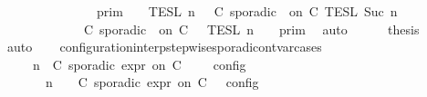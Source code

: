 \begin{isabellebody}
\ \ \ \ \ \ \ \ \ \ \ \ {\isasymunion}\ {\isasymlbrakk}{\isasymlbrakk}\ {\isasymGamma}\ {\isasymrbrakk}{\isasymrbrakk}\isactrlsub p\isactrlsub r\isactrlsub i\isactrlsub m\ {\isasyminter}\ {\isasymlbrakk}{\isasymlbrakk}\ {\isasymPsi}\ {\isasymrbrakk}{\isasymrbrakk}\isactrlsub T\isactrlsub E\isactrlsub S\isactrlsub L\isactrlbsup {\isasymge}\ n\isactrlesup \ {\isasyminter}\ {\isasymlbrakk}\ C\ sporadic\ {\isasymtau}\ on\ C\ {\isasymrbrakk}\isactrlsub T\isactrlsub E\isactrlsub S\isactrlsub L\isactrlbsup {\isasymge}\ Suc\ n\isactrlesup \isanewline
\ \ \ \ \ \ \ \ \ \ \ {\isacharequal}\ {\isasymlbrakk}{\isasymlbrakk}\ {\isacharparenleft}C\ sporadic\ {\isasymtau}\ on\ C\ {\isacharhash}\ {\isasymPsi}\ {\isasymrbrakk}{\isasymrbrakk}\isactrlsub T\isactrlsub E\isactrlsub S\isactrlsub L\isactrlbsup {\isasymge}\ n\isactrlesup \ {\isasyminter}\ {\isasymlbrakk}{\isasymlbrakk}\ {\isasymGamma}\ {\isasymrbrakk}{\isasymrbrakk}\isactrlsub p\isactrlsub r\isactrlsub i\isactrlsub m{\isacartoucheclose}\ \isamarkupfalse%
\ auto\isanewline
\ \ \ \ \isamarkupfalse%
\ {\isacharquery}thesis\ \isamarkupfalse%
\ auto\isanewline
\ \ \isamarkupfalse%
\isanewline
{}\isamarkupfalse%
%
\endisatagproof
{\isafoldproof}%
%
\isadelimproof
\isanewline
%
\endisadelimproof
\isanewline
{}\isamarkupfalse%
\ configuration{\isacharunderscore}interp{\isacharunderscore}stepwise{\isacharunderscore}sporadicon{\isacharunderscore}tvar{\isacharunderscore}cases{\isacharcolon}\isanewline
\ \ \ {\isacartoucheopen}{\isasymlbrakk}\ {\isasymGamma}{\isacharcomma}\ n\ {\isasymTurnstile}\ {\isacharparenleft}{\isacharparenleft}C\ sporadic{\isasymsharp}\ {\isasymtau}\isactrlsub e\isactrlsub x\isactrlsub p\isactrlsub r\ on\ C\ {\isacharhash}\ {\isasymPsi}{\isacharparenright}\ {\isasymtriangleright}\ {\isasymPhi}\ {\isasymrbrakk}\isactrlsub c\isactrlsub o\isactrlsub n\isactrlsub f\isactrlsub i\isactrlsub g\isanewline
\ \ \ \ {\isacharequal}\ {\isasymlbrakk}\ {\isasymGamma}{\isacharcomma}\ n\ {\isasymTurnstile}\ {\isasymPsi}\ {\isasymtriangleright}\ {\isacharparenleft}{\isacharparenleft}C\ sporadic{\isasymsharp}\ {\isasymtau}\isactrlsub e\isactrlsub x\isactrlsub p\isactrlsub r\ on\ C\ {\isacharhash}\ {\isasymPhi}{\isacharparenright}\ {\isasymrbrakk}\isactrlsub c\isactrlsub o\isactrlsub n\isactrlsub f\isactrlsub i\isactrlsub g\isanewline

\end{isabellebody}
